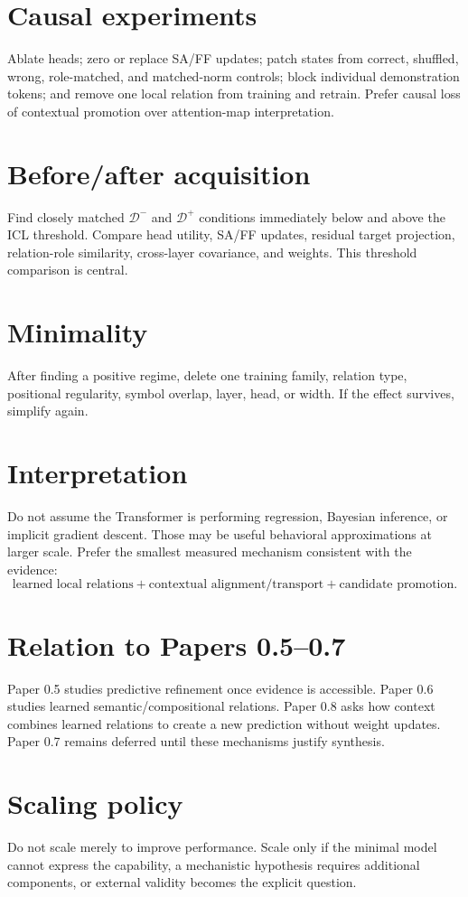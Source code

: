 \documentclass[10pt]{article}
\begin{document}
\section{Causal experiments}
Ablate heads; zero or replace SA/FF updates; patch states from correct, shuffled, wrong, role-matched, and matched-norm controls; block individual demonstration tokens; and remove one local relation from training and retrain. Prefer causal loss of contextual promotion over attention-map interpretation.

\section{Before/after acquisition}
Find closely matched \(\mathcal D^-\) and \(\mathcal D^+\) conditions immediately below and above the ICL threshold. Compare head utility, SA/FF updates, residual target projection, relation-role similarity, cross-layer covariance, and weights. This threshold comparison is central.

\section{Minimality}
After finding a positive regime, delete one training family, relation type, positional regularity, symbol overlap, layer, head, or width. If the effect survives, simplify again.

\section{Interpretation}
Do not assume the Transformer is performing regression, Bayesian inference, or implicit gradient descent. Those may be useful behavioral approximations at larger scale. Prefer the smallest measured mechanism consistent with the evidence:
\[
\boxed{\text{learned local relations}+\text{contextual alignment/transport}+\text{candidate promotion}.}
\]

\section{Relation to Papers 0.5--0.7}
Paper 0.5 studies predictive refinement once evidence is accessible. Paper 0.6 studies learned semantic/compositional relations. Paper 0.8 asks how context combines learned relations to create a new prediction without weight updates. Paper 0.7 remains deferred until these mechanisms justify synthesis.

\section{Scaling policy}
Do not scale merely to improve performance. Scale only if the minimal model cannot express the capability, a mechanistic hypothesis requires additional components, or external validity becomes the explicit question.
\end{document}
